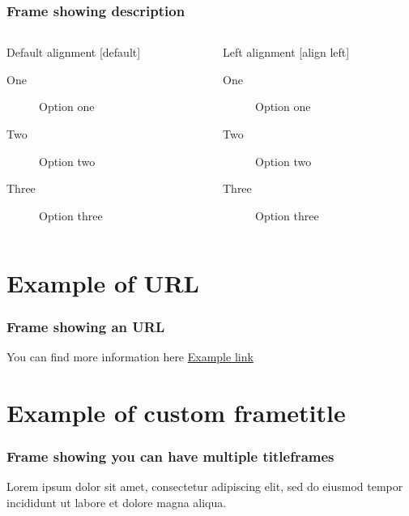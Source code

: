 \documentclass[aspectratio=169]{beamer}
\begin{document}
\begin{frame}
    \frametitle{Frame showing description}

    \begin{columns}
        \begin{column}{0.5\textwidth}
            Default alignment
            [default]
            \begin{description}%
                \item[One] Option one%
                \item[Two] Option two%
                \item[Three] Option three%
            \end{description}%
        \end{column}
        \begin{column}{0.5\textwidth}
            Left alignment
            [align left]
            \begin{description}%
                \item[One] Option one%
                \item[Two] Option two%
                \item[Three] Option three%
            \end{description}%
        \end{column}
    \end{columns}

\end{frame}

\section{Example of URL}
\begin{frame}
    \frametitle{Frame showing an URL}
    
    You can find more information here \href{http://www.example.com}{Example link}

\end{frame}

\section{Example of custom frametitle}
\begin{titleframe}
    \frametitle{Frame showing you can have multiple titleframes}
    Lorem ipsum dolor sit amet, consectetur adipiscing elit, sed do eiusmod tempor incididunt ut labore et dolore magna aliqua. 
\end{titleframe}
\end{document}
